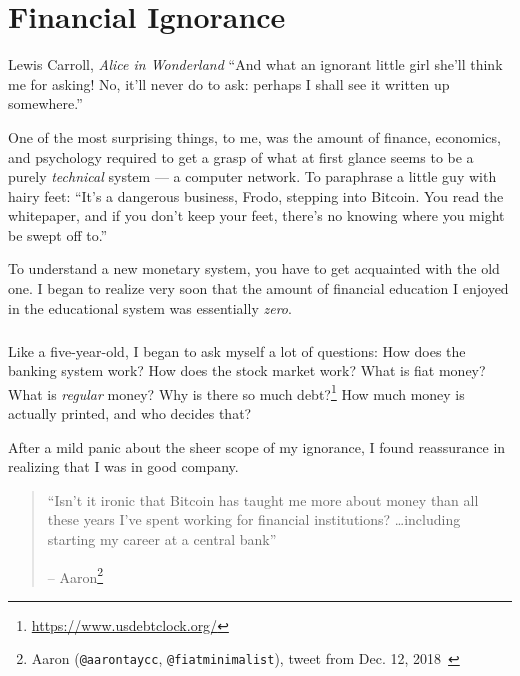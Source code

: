 \chapter{Financial Ignorance}
\label{les:8}

\begin{chapquote}{Lewis Carroll, \textit{Alice in Wonderland}}
\enquote{And what an ignorant little girl she'll think me for asking! No, it'll never
do to ask: perhaps I shall see it written up somewhere.}
\end{chapquote}

One of the most surprising things, to me, was the amount of finance,
economics, and psychology required to get a grasp of what at first
glance seems to be a purely \textit{technical} system --- a computer network.
To paraphrase a little guy with hairy feet: \enquote{It's a dangerous business,
Frodo, stepping into Bitcoin. You read the whitepaper, and if you don't
keep your feet, there's no knowing where you might be swept off to.}

To understand a new monetary system, you have to get acquainted with the
old one. I began to realize very soon that the amount of financial
education I enjoyed in the educational system was essentially \textit{zero}.

\paragraph{}
Like a five-year-old, I began to ask myself a lot of questions: How does the
banking system work? How does the stock market work? What is fiat money? What is
\textit{regular} money? Why is there so much
debt?\footnote{\url{https://www.usdebtclock.org/}} How much money is actually
printed, and who decides that?

\newpage

After a mild panic about the sheer scope of my ignorance, I found
reassurance in realizing that I was in good company.

\begin{quotation}\begin{samepage}
\enquote{Isn't it ironic that Bitcoin has taught me more about money than all these
years I've spent working for financial institutions? \ldots including starting my
career at a central bank}
\begin{flushright} -- Aaron\footnote{Aaron (\texttt{@aarontaycc}, \texttt{@fiatminimalist}), tweet from Dec.
12, 2018~\cite{aarontaycc-tweet}}
\end{flushright}\end{samepage}\end{quotation}


